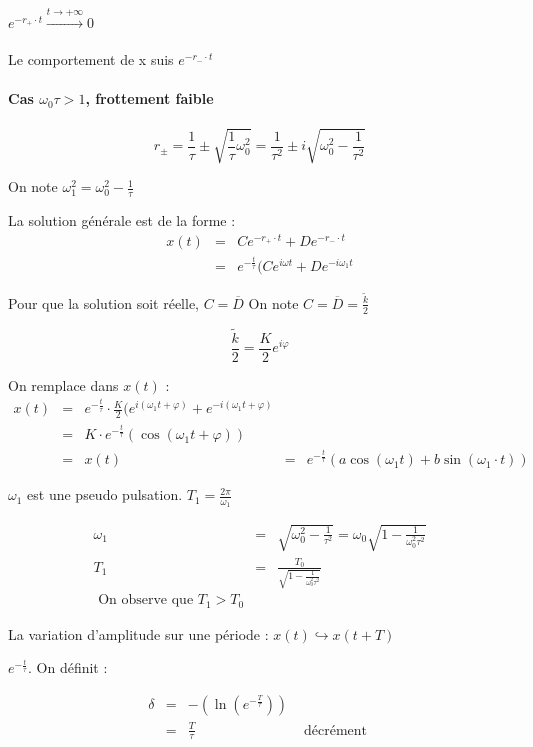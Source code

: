 	$e^{-r_+ \cdot t} \xrightarrow[]{t \to +\infty} 0$

	Le comportement de x suis $e^{-r_- \cdot t}$

	\paragraph{Cas $\omega_0 \tau > 1$, frottement faible}
	\[r_{\pm} = \frac{1}{\tau} \pm \sqrt{\frac{1}{\tau}\omega_0^2} = \frac{1}{\tau^2} \pm i \sqrt{\omega_0^2 - \frac{1}{\tau^2}}\]

	On note $\omega_1^2 = \omega_0^2 - \frac{1}{\tau}$

	La solution générale est de la forme : 
	\[\begin{array}{rcl}
			x(t) &=& Ce^{-r_+ \cdot t} + De^{-r_- \cdot t} \\
					   &=& e^{-\frac{t}{\tau}} (Ce^{i\omega t} + De^{-i\omega_1 t} \end{array}\]

	Pour que la solution soit réelle, $C = \overline{D}$
On note $C = \overline{D} = \frac{\tilde{k}}{2}$

\[\frac{\tilde{k}}{2} = \frac{K}{2}e^{i\varphi}\]

On remplace dans $x(t)$ :
\[\begin{array}{rcl}
		x(t) &=& e^{-\frac{t}{\tau}} \cdot \frac{K}{2} (e^{i(\omega_1 t + \varphi)} + e^{-i(\omega_1 t + \varphi)} \\
				   &=& K \cdot e^{-\frac{t}{\tau}}(\cos(\omega_1 t + \varphi)) \\
				   &=& x(t) &=& e^{-\frac{t}{\tau}}(a\cos(\omega_1 t) + b \sin(\omega_1 \cdot t))
		\end{array}\]

	$\omega_1$ est une pseudo pulsation.
	$T_1 = \frac{2\pi}{\omega_1}$

	\[\begin{array}{rcl}
			\omega_1 &=& \sqrt{\omega_0^2 - \frac{1}{\tau^2}} = \omega_0 \sqrt{1-\frac{1}{\omega_0^2 \tau^2}} \\
			T_1 &=& \frac{T_0}{\sqrt{1 - \frac{1}{\omega_0^2  \tau^2}}} \\
	\text{ On observe que  } T_1 > T_0\end{array}\]

	La variation d'amplitude sur une période : $x(t) \hookrightarrow x(t + T)$

	$e^{-\frac{t}{\tau}}$. On définit :

	\[\begin{array}{rcll}
		\delta &=& -(\ln(e^{-\frac{T}{\tau}})) \\
						   &=& \frac{T}{\tau} & \text{ décrément }
	\end{array}\]

